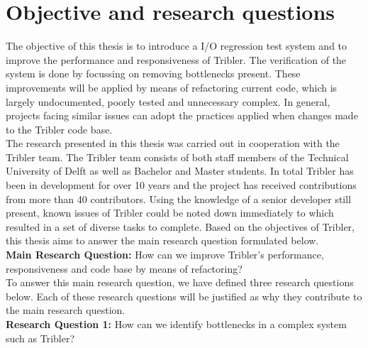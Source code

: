 
\section{Objective and research questions}
\label{chp2:sct:objectives-research-questions}
The objective of this thesis is to introduce a I/O regression test system and to improve the performance and responsiveness of Tribler.
The verification of the system is done by focussing on removing bottlenecks present.
These improvements will be applied by means of refactoring current code, which is largely undocumented, poorly tested and unnecessary complex.
In general, projects facing similar issues can adopt the practices applied when changes made to the Tribler code base.\\

The research presented in this thesis was carried out in cooperation with the Tribler team. 
The Tribler team consists of both staff members of the Technical University of Delft as well as Bachelor and Master students.
In total Tribler has been in development for over 10 years and the project has received contributions from more than 40 contributors.
Using the knowledge of a senior developer still present, known issues of Tribler could be noted down immediately to which resulted in a set of diverse tasks to complete.
Based on the objectives of Tribler, this thesis aims to answer the main research question formulated below.\\

\textbf{Main Research Question:} How can we improve Tribler's performance, responsiveness and code base by means of refactoring?\\

To answer this main research question, we have defined three research questions below. Each of these research questions will be justified as why they contribute to the main research question.\\

\textbf{Research Question 1:} How can we identify bottlenecks in a complex system such as Tribler?\\

